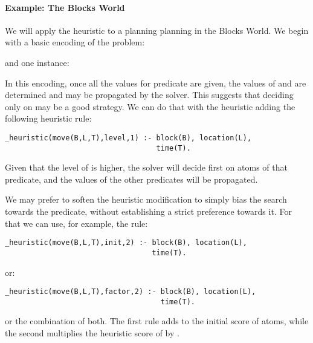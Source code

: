 \paragraph{Example: The Blocks World}
We will apply the  heuristic to a planning planning in the Blocks World.  
We begin with a basic encoding of the problem:

and one instance:

%
In this encoding, once all the values for predicate  are given,
the values of  and  are determined and may be propagated by the solver.
This suggests that deciding only on  may be a good strategy.
We can do that with the  heuristic 
adding the following heuristic rule:

\begin{lstlisting}[basicstyle=\small\ttfamily,numbers=none]
_heuristic(move(B,L,T),level,1) :- block(B), location(L), 
                                   time(T).
\end{lstlisting}
Given that the level of  is higher,  the solver 
will decide first on atoms of that predicate,
and the values of the other predicates will be propagated.

We may prefer to soften the heuristic modification to simply bias the search  towards the  predicate,
without establishing a strict preference towards it.  For that we can use, for example, the rule:
\begin{lstlisting}[basicstyle=\small\ttfamily,numbers=none]
_heuristic(move(B,L,T),init,2) :- block(B), location(L), 
                                  time(T).
\end{lstlisting} 
or:
\begin{lstlisting}[basicstyle=\small\ttfamily,numbers=none]
_heuristic(move(B,L,T),factor,2) :- block(B), location(L), 
                                    time(T).
\end{lstlisting}
or the combination of both.  
The first rule adds  to the initial score of  atoms,
while the second multiplies the heuristic score of  by .

